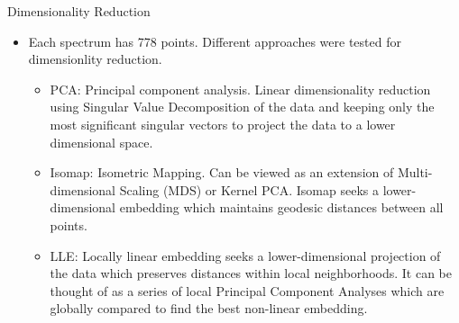 \documentclass[final,hyperref={pdfpagelabels=false}]{beamer}
\begin{document}
\begin{frame}[t]
\begin{columns}[t]
\begin{column}{.465\textwidth}
\begin{block}{Dimensionality Reduction}
\begin{itemize}
\item Each spectrum has 778 points. Different approaches were tested for dimensionlity reduction.
\begin{itemize}
\item PCA: Principal component analysis. Linear dimensionality reduction using Singular Value Decomposition of the data and keeping only the most significant singular vectors to project the data to a lower dimensional space.
\item Isomap: Isometric Mapping. Can be viewed as an extension of Multi-dimensional Scaling (MDS) or Kernel PCA. Isomap seeks a lower-dimensional embedding which maintains geodesic distances between all points.
\item LLE: Locally linear embedding seeks a lower-dimensional projection of the data which preserves distances within local neighborhoods. It can be thought of as a series of local Principal Component Analyses which are globally compared to find the best non-linear embedding.
\end{itemize}
\end{itemize}




\end{block}
\end{column}
\end{columns}
\end{frame}
\end{document}
